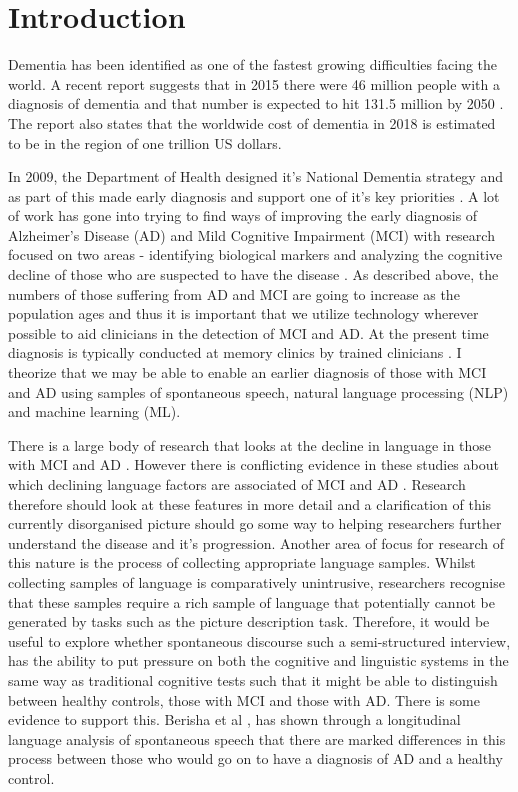 \documentclass[12pt]{article}
\begin{document}
\tableofcontents
\section{Introduction}
Dementia has been identified as one of the fastest growing difficulties facing the world. A recent report suggests that in 2015 there were 46 million people with a diagnosis of dementia and that number is expected to hit 131.5 million by 2050 \cite{Prince2015}. The report also states that the worldwide cost of dementia in 2018 is estimated to be in the region of one trillion US dollars.
\par
In 2009, the Department of Health designed it's National Dementia strategy and as part of this made early diagnosis and support one of it's key priorities \cite{England2009}. A lot of work has gone into trying to find ways of improving the early diagnosis of Alzheimer's Disease (AD) and Mild Cognitive Impairment (MCI) with research focused on two areas - identifying biological markers and analyzing the cognitive decline of those who are suspected to have the disease \cite{Taler2008}. As described above, the numbers of those suffering from AD and MCI are going to increase as the population ages \cite{Prince2015} and thus it is important that we utilize technology wherever possible to aid clinicians in the detection of MCI and AD. At the present time diagnosis is typically conducted at memory clinics by trained clinicians \cite{Boschi2017}. I theorize that we may be able to enable an earlier diagnosis of those with MCI and AD using samples of spontaneous speech, natural language processing (NLP) and machine learning (ML).
\par
There is a large body of research that looks at the decline in language in those with MCI and AD \cite{Taler2008, Boschi2017}. However there is conflicting evidence in these studies about which declining language factors are associated of MCI and AD \cite{Taler2008, Boschi2017}. Research therefore should look at these features in more detail and a clarification of this currently disorganised picture should go some way to helping researchers further understand the disease and it's progression. Another area of focus for research of this nature is the process of collecting appropriate language samples. Whilst collecting samples of language is comparatively unintrusive, researchers recognise that these samples require a rich sample of language that potentially cannot be generated by tasks such as the picture description task. Therefore, it would be useful to explore whether spontaneous discourse such a semi-structured interview, has the ability to put pressure on both the cognitive and linguistic systems in the same way as traditional cognitive tests such that it might be able to distinguish between healthy controls, those with MCI and those with AD. There is some evidence to support this. Berisha et al \cite{Berisha2015}, has shown through a longitudinal language analysis of spontaneous speech that there are marked differences in this process between those who would go on to have a diagnosis of AD and a healthy control. 
\end{document}
